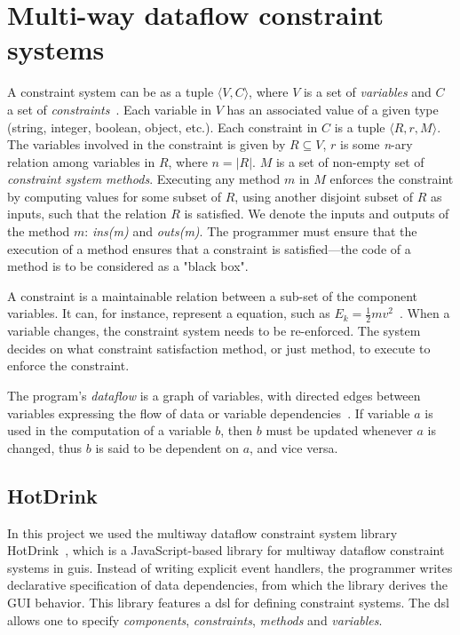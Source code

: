 \chapter{Multi-way dataflow constraint systems}
\label{chap:constraint-systems}

A constraint system can be as a tuple ${\langle V, C \rangle}$, where $V$ is a set of \textit{variables} and $C$ a set of \textit{constraints}~\cite{jarvi_algorithms_2009}. Each variable in $V$ has an associated value of a given type (string, integer, boolean, object, etc.). Each constraint in $C$ is a tuple ${\langle R, r, M \rangle}$. The variables involved in the constraint is given by ${R \subseteq V}$, $r$ is some \textit{n}-ary relation among variables in $R$, where ${n = \lvert R \rvert}$. $M$ is a set of non-empty set of \textit{constraint system methods}. Executing any method $m$ in $M$ enforces the constraint by computing values for some subset of $R$, using another disjoint subset of $R$ as inputs, such that the relation $R$ is satisfied. We denote the inputs and outputs of the method $m$: \textit{ins(m)} and \textit{outs(m)}. The programmer must ensure that the execution of a method ensures that a constraint is satisfied---the code of a method is to be considered as a "black box". 

A constraint is a maintainable relation between a sub-set of the component variables. It can, for instance, represent a equation, such as  $E_k = \frac{1}{2}mv^2$~\cite{svartveit2021multithreaded}. When a variable changes, the constraint system needs to be re-enforced. The system decides on what constraint satisfaction method, or just method, to execute to enforce the constraint.

The program's \textit{dataflow} is a graph of variables, with directed edges between variables expressing the flow of data or variable dependencies~\cite{stokke2020declaratively}. If variable $a$ is used in the computation of a variable $b$, then $b$ must be updated whenever $a$ is changed, thus $b$ is said to be dependent on $a$, and vice versa.

\section{HotDrink}
\label{sec:hotdrink}

In this project we used the multiway dataflow constraint system library 
HotDrink~\cite{HotDrink, HotDrink1}, which is a JavaScript-based library for multiway dataflow constraint systems in \gls{gui}s. Instead of writing explicit event handlers, the programmer writes declarative specification of data dependencies, from which the library derives the GUI behavior. This library features a \gls{dsl} for defining constraint systems. The \gls{dsl} allows one to specify \emph{components}, \emph{constraints}, \emph{methods} and \emph{variables}. 

